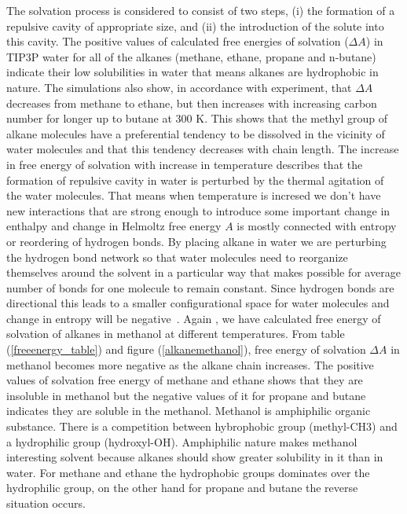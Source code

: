  The solvation process is considered to consist of two steps, (i) the formation of a repulsive cavity of appropriate size, and (ii) the introduction of the solute into this cavity. The positive values of calculated  free energies of solvation ($\Delta A$) in  TIP3P water   for all of the alkanes (methane, ethane, propane and n-butane) indicate their low solubilities in water that means alkanes are hydrophobic in nature. The simulations also show, in
 accordance  with experiment, that $\Delta A$ decreases from methane to ethane, but then increases with increasing carbon number for longer up to butane at 300 K. This shows that the methyl group of alkane molecules have a preferential tendency to be dissolved in the vicinity of water molecules and that this tendency decreases with
 chain length. The increase in free energy of solvation with increase in temperature   describes  that the formation of repulsive cavity in water is perturbed by the thermal agitation of the water molecules. That means when temperature is incresed  we don't have new interactions that are strong enough to introduce some important change in enthalpy and change in Helmoltz free energy $A$  is mostly connected with entropy or reordering of hydrogen bonds. By placing alkane in water  we are perturbing the hydrogen bond  network so that water molecules need to reorganize themselves around the solvent in a particular way that makes possible for average number of bonds for one molecule to remain  constant. Since hydrogen bonds are directional this leads to a smaller configurational space for
 water  molecules  and change in entropy will be negative~\citep{Wu2008, abraham1988temperature}. Again , we have calculated free energy of solvation of alkanes in methanol at different temperatures. From table (\ref{freeenergy_table}) and figure (\ref{alkanemethanol}), free energy of solvation $\Delta A$  in methanol becomes more negative as the alkane chain increases. The positive values of solvation free energy of methane and ethane shows that they are insoluble in methanol but the negative values of it for propane and butane indicates they are soluble in the methanol. Methanol is  amphiphilic organic substance. There  is a competition between hybrophobic group (methyl-CH3) and a hydrophilic group (hydroxyl-OH). Amphiphilic nature makes methanol interesting solvent because alkanes should show greater solubility in it than in water. For methane and ethane the hydrophobic groups dominates over the hydrophilic group, on the other hand for propane and butane the reverse situation occurs.  
   

 



 